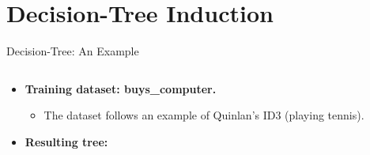 \section{Decision-Tree Induction}

\begin{frame}{Decision-Tree: An Example}
	\begin{columns}
		\begin{column}{0.38\textwidth}
			\vspace{-3cm}
			\begin{itemize}
				\item \textbf{Training dataset: buys\_computer.}
				      \begin{itemize}
					      \item The dataset follows an example of Quinlan's ID3 (playing tennis).
				      \end{itemize}
				\item \textbf{Resulting tree:}\\[0.1cm]
			\end{itemize}
			\centering
			
		\end{column}
		\begin{column}{0.62\textwidth}
			\small
			
		\end{column}
	\end{columns}
\end{frame}


